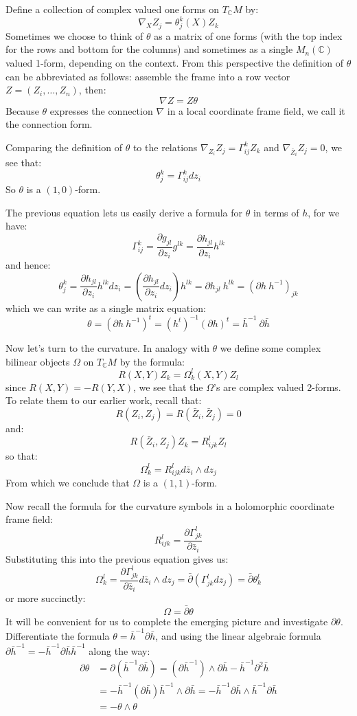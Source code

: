 \documentclass[11pt]{amsart}
\theoremstyle{definition}
\def \C{ \mathbb{C} }
\def \del{ \partial }
\def \delbar{ \bar{\partial} }
\begin{document}
 Define a collection of complex valued one forms on $T_{\C}M$ by:
%
$$ \nabla_{X} Z_j = \theta^k_j (X) Z_k $$
%
Sometimes we choose to think of $\theta$ as a matrix of one forms (with the top index for the rows and bottom for the columns) and sometimes as a single $M_n(\C)$ valued 1-form, depending on the context.  From this perspective the definition of $\theta$ can be abbreviated as follows: assemble the frame into a row vector $Z = (Z_i, \ldots, Z_n)$, then:
%
$$ \nabla Z = Z \theta $$
%
Because $\theta$ expresses the connection $\nabla$ in a local coordinate frame field, we call it the connection form.

Comparing the definition of $\theta$ to the relations $ \nabla_{Z_i} Z_j = \Gamma_{ij}^k Z_k $ and $\nabla_{\bar{Z}_i} Z_j = 0$, we see that:
%
$$ \theta^k_j = \Gamma_{ij}^k d z_i $$
%
So $\theta$ is a $(1,0)$-form.

The previous equation lets us easily derive a formula for $\theta$ in terms of $h$, for we have:
%
$$ \Gamma_{ij}^k = \frac{ \del g_{jl} }{ \del z_i } g^{lk} = \frac{ \del h_{jl} }{ \del z_i } h^{lk} $$
%
and hence:
%
$$ \theta^k_j = \frac{ \del h_{jl} }{ \del z_i } h^{lk} d z_i = \left( \frac{ \del h_{jl} }{ \del z_i } d z_i \right) h^{lk} = \del h_{jl} \ h^{lk} = ( \del h \ h^{-1} )_{jk} $$
%
which we can write as a single matrix equation:
%
$$ \theta = ( \del h \ h^{-1} )^{t} = (h^t)^{-1} (\del h)^{t} = \bar{h}^{-1} \ \del \bar{h} $$

Now let's turn to the curvature.  In analogy with $\theta$ we define some complex bilinear objects $\Omega$ on $T_{\C}M$ by the formula:
%
$$ R( X, Y ) Z_k = \Omega_k^l (X, Y) Z_l $$
%
since $R(X,Y) = - R(Y,X)$, we see that the $\Omega$'s are complex valued 2-forms.  To relate them to our earlier work, recall that:
%
$$ R(Z_i, Z_j) = R( \bar{Z}_i, \bar{Z}_j ) = 0 $$
%
and:
%
$$ R( \bar{Z}_i, Z_j )Z_k = R_{ijk}^l Z_l $$
%
so that:
%
$$ \Omega_k^l = R_{ijk}^l d \bar{z}_i \wedge d z_j $$
%
From which we conclude that $\Omega$ is a $(1,1)$-form.

Now recall the formula for the curvature symbols in a holomorphic coordinate frame field:
%
$$ R_{ijk}^l = \frac{ \del \Gamma_{jk}^l }{ \del \bar{z}_i } $$
%
Substituting this into the previous equation gives us:
%
$$ \Omega_k^l = \frac{ \del \Gamma_{jk}^l }{ \del \bar{z}_i } d \bar{z}_i \wedge d z_j = \delbar( \Gamma_{jk}^l d z_j ) = \delbar \theta_k^l $$
%
or more succinctly:
%
$$ \Omega = \delbar \theta $$
%
It will be convenient for us to complete the emerging picture and investigate $ \del \theta $.  Differentiate the formula $\theta = \bar{h}^{-1} \del \bar{h}$, and using the linear algebraic formula $\del \bar{h}^{-1} = - \bar{h}^{-1} \del \bar{h} \bar{h}^{-1}$ along the way:
%
\begin{align*}
\del \theta &= \del(  \bar{h}^{-1} \del \bar{h} ) = ( \del \bar{h}^{-1} ) \wedge \del \bar{h} - \bar{h}^{-1} \del^2 \bar{h} \\
&= - \bar{h}^{-1} (\del \bar{h}) \bar{h}^{-1} \wedge \del \bar{h}  = - \bar{h}^{-1} \del \bar{h} \wedge \bar{h}^{-1} \del \bar{h} \\
&= - \theta \wedge \theta
\end{align*}
\end{document}
